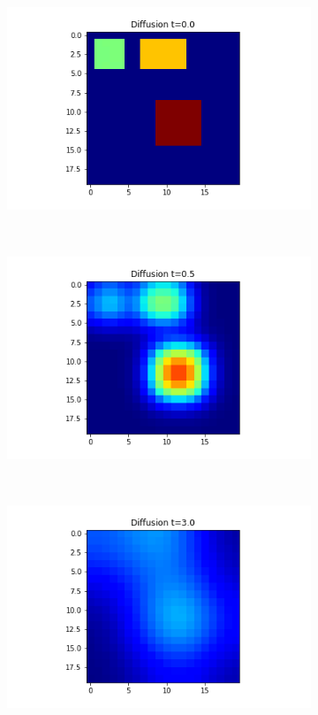 \documentclass[10pt,a4paper]{article}
\begin{document}
\begin{figure}[!h]
	\centering
	\begin{subfigure}[b]{0.25\textwidth}
		\includegraphics[width=\textwidth]{images/grid-t0-x0.png}
	\end{subfigure}~
	\begin{subfigure}[b]{0.25\textwidth}
		\includegraphics[width= \textwidth]{images/grid-t05-x0.png}
	\end{subfigure}~
    \begin{subfigure}[b]{0.25\textwidth}
    	\includegraphics[width= \textwidth]{images/grid-t3-x0.png}

\end{subfigure}
\end{figure}
\end{document}
